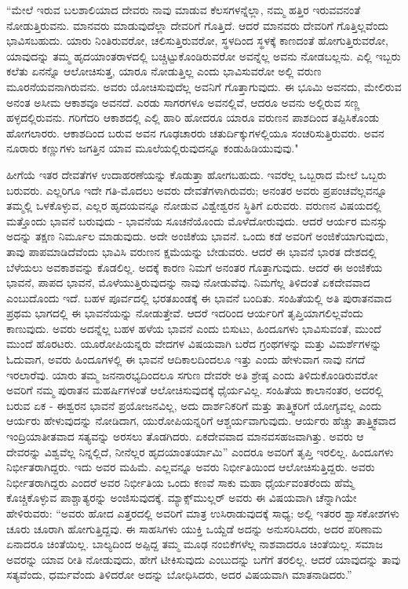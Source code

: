 “ಮೇಲೆ ಇರುವ ಬಲಶಾಲಿಯಾದ ದೇವರು ನಾವು ಮಾಡುವ ಕೆಲಸಗಳನ್ನೆಲ್ಲಾ, ನಮ್ಮ ಹತ್ತಿರ ಇರುವವನಂತೆ ನೋಡುತ್ತಿರುವನು. ಮಾನವರು ಮಾಡುವುದೆಲ್ಲಾ ದೇವರಿಗೆ ಗೊತ್ತಿದೆ. ಆದರೆ ಮಾನವರು ದೇವರಿಗೆ ಗೊತ್ತಿಲ್ಲವೆಂದು ಭಾವಿಸಬಹುದು. ಯಾರು ನಿಂತಿರುವರೋ, ಚಲಿಸುತ್ತಿರುವರೋ, ಸ್ಥಳದಿಂದ ಸ್ಥಳಕ್ಕೆ ಕಾಣದಂತೆ ಹೋಗುತ್ತಿರುವರೋ, ಯಾವುದನ್ನು ತಮ್ಮ ಹೃದಯಾಂತರಾಳದಲ್ಲಿ ಬಚ್ಚಿಟ್ಟುಕೊಂಡಿರುವರೋ ಅವನ್ನೆಲ್ಲ ಅವನು ನೋಡಬಲ್ಲನು. ಎಲ್ಲಿ ಇಬ್ಬರು ಕಲೆತು ಏನನ್ನೊ ಆಲೋಚಿಸುತ್ತ, ಯಾರೂ ನೋಡುತ್ತಿಲ್ಲ ಎಂದು ಭಾವಿಸುವರೋ ಅಲ್ಲಿ ವರುಣ ಮೂರನೆಯವನಾಗಿರುವನು. ಅವರು ಯೋಚಿಸುವುದೆಲ್ಲ ಅವನಿಗೆ ಗೊತ್ತಾಗುವುದು. ಈ ಭೂಮಿ ಅವನದು, ಮೇಲಿರುವ ಅನಂತ ಅಸೀಮ ಆಕಾಶವೂ ಅವನದೆ. ಎರಡು ಸಾಗರಗಳೂ ಅವನಲ್ಲಿವೆ, ಆದರೂ ಅವನು ಅಲ್ಲಿರುವ ಸಣ್ಣ ಹಳ್ಳದಲ್ಲಿರುವನು. ಗರಿಗೆದರಿ ಆಕಾಶದಲ್ಲಿ ಎಲ್ಲಿ ಹಾರಿ ಹೋದರೂ ಯಾರೂ ವರುಣನ ಪಾಶದಿಂದ ತಪ್ಪಿಸಿಕೊಂಡು ಹೋಗಲಾರರು. ಆಕಾಶದಿಂದ ಬರುವ ಅವನ ಗೂಢಚಾರರು ಚತುರ್ದಿಕ್ಕುಗಳಲ್ಲಿಯೂ ಸಂಚರಿಸುತ್ತಿರುವರು. ಅವನ ನೂರಾರು ಕಣ್ಣುಗಳು ಜಗತ್ತಿನ ಯಾವ ಮೂಲೆಯಲ್ಲಿರುವುದನ್ನೂ ಕಂಡುಹಿಡಿಯುವುವು."

ಹೀಗೆಯೆ ಇತರ ದೇವತೆಗಳ ಉದಾಹರಣೆಯನ್ನು ಕೊಡುತ್ತಾ ಹೋಗಬಹುದು. ಇವರೆಲ್ಲ ಒಬ್ಬರಾದ ಮೇಲೆ ಒಬ್ಬರು ಬರುವರು. ಎಲ್ಲರಿಗೂ ಇದೇ ಗತಿ-ಮೊದಲು ಅವರು ದೇವತೆಗಳಾಗಿರುವರು; ಅನಂತರ ಅವರು ಪ್ರಪಂಚವೆಲ್ಲವನ್ನೂ ತಮ್ಮಲ್ಲಿ ಒಳಕೊಳ್ಳುವ, ಎಲ್ಲರ ಹೃದಯವನ್ನೂ ನೋಡುವ ವಿಶ್ವೇಶ್ವರನ ಸ್ಥಿತಿಗೆ ಏರುವರು. ವರುಣನ ವಿಷಯದಲ್ಲಿ ಮತ್ತೊಂದು ಭಾವನೆ ಬರುವುದು - ಭಾವನೆಯ ಸೂಚನೆಯೊಂದು ಮೊಳೆದೋರುವುದು. ಆದರೆ ಆರ್ಯರ ಮನಸ್ಸು ಅದನ್ನು ತಕ್ಷಣ ನಿರ್ಮೂಲ ಮಾಡುವುದು. ಅದೇ ಅಂಜಿಕೆಯ ಭಾವನೆ. ಒಂದು ಕಡೆ ಅವರಿಗೆ ಅಂಜಿಕೆಯಾಗುವುದು, ತಾವು ಪಾಪಮಾಡಿದೆವೆಂದು ಭಾವಿಸಿ ವರುಣನ ಕ್ಷಮೆಯನ್ನು ಬೇಡುವರು. ಆದರೆ ಈ ಭಾವನೆ ಭಾರತ ದೇಶದಲ್ಲಿ ಬೆಳೆಯಲು ಅವಕಾಶವನ್ನು ಕೊಡಲಿಲ್ಲ. ಅದಕ್ಕೆ ಕಾರಣ ನಿಮಗೆ ಅನಂತರ ಗೊತ್ತಾಗುವುದು. ಆದರೆ ಈ ಅಂಜಿಕೆಯ ಭಾವನೆ, ಪಾಪದ ಭಾವನೆ, ಮೊಳೆಯುತ್ತಿರುವುದನ್ನು ನಾವು ನೋಡುವೆವು. ನಿಮಗೆಲ್ಲ ತಿಳಿದಂತೆ ಏಕದೇವವಾದ ಎಂಬುದೊಂದು ಇದೆ. ಬಹಳ ಪೂರ್ವದಲ್ಲಿ ಭರತಖಂಡಕ್ಕೆ ಈ ಭಾವನೆ ಬಂದಿತು. ಸಂಹಿತೆಯಲ್ಲಿ ಅತಿ ಪುರಾತನವಾದ ಪ್ರಥಮ ಭಾಗದಲ್ಲಿ ಈ ಭಾವನೆಯನ್ನು ನೋಡುತ್ತೇವೆ. ಆದರೆ ಇದರಿಂದ ಆರ್ಯರಿಗೆ ತೃಪ್ತಿಯಾಗಲಿಲ್ಲವೆಂದು ಕಾಣುವುದು. ಅವರು ಅದನ್ನೆಲ್ಲ ಬಹಳ ಹಳೆಯ ಭಾವನೆ ಎಂದು ಬಿಸುಟು, ಹಿಂದೂಗಳು ಭಾವಿಸುವಂತೆ, ಮುಂದೆ ಮುಂದೆ ಹೊರಟರು. ಯೂರೋಪಿಯನ್ನರು ವೇದಗಳ ವಿಷಯವಾಗಿ ಬರೆದ ಗ್ರಂಥಗಳನ್ನು ಮತ್ತು ವಿಮರ್ಶೆಗಳನ್ನು ಓದುವಾಗ, ಅವರು ಹಿಂದೂಗಳಲ್ಲಿ ಈ ಭಾವನೆ ಆದಿಕಾಲದಿಂದಲೂ ಇತ್ತು ಎಂದು ಹೇಳುವಾಗ ನಾವು ನಗದೆ ಇರಲಾರೆವು. ಯಾರು ತಮ್ಮ ಜನನಾರಭ್ಯದಿಂದಲೂ ಸಗುಣ ದೇವರೇ ಅತಿ ಶ್ರೇಷ್ಠ ಎಂದು ತಿಳಿದುಕೊಂಡಿರುವರೋ ಅವರಿಗೆ ನಮ್ಮ ಪುರಾತನ ಮಹರ್ಷಿಗಳಂತೆ ಆಲೋಚಿಸುವುದಕ್ಕೆ ಧೈರ್ಯವಿಲ್ಲ. ಸಂಹಿತೆಯ ಕಾಲಾನಂತರ, ಅದರಲ್ಲಿ ಬರುವ ಏಕ - ಈಶ್ವರನ ಭಾವನೆ ಪ್ರಯೋಜನವಿಲ್ಲ, ಅದು ದಾರ್ಶನಿಕರಿಗೆ ಮತ್ತು ತಾತ್ತ್ವಿಕರಿಗೆ ಯೋಗ್ಯವಲ್ಲ ಎಂದು ಆರ್ಯರು ಹೇಳುವುದನ್ನು ನೋಡಿದಾಗ, ಯುರೋಪಿಯನ್ನರಿಗೆ ಆಶ್ಚರ್ಯವಾಗುವುದು. ಆರ್ಯರು ಹೆಚ್ಚು ತಾತ್ತ್ವಿಕವಾದ ಇಂದ್ರಿಯಾತೀತವಾದ ಸತ್ಯವನ್ನು ಅರಸಲು ತೊಡಗಿದರು. ಏಕದೇವವಾದ ಮಾನವಸಹಜವಾಗಿತ್ತು. ಅವರು ಆ ದೇವರನ್ನು ವಿಶ್ವವೆಲ್ಲ ನಿನ್ನಲ್ಲಿದೆ, ನೀನೆಲ್ಲರ ಹೃದಯಾಂತರ್ಯಾಮಿ” ಎಂದರೂ ಅವರಿಗೆ ತೃಪ್ತಿ ಇರಲಿಲ್ಲ. ಹಿಂದೂಗಳು ನಿರ್ಭೀತರಾಗಿದ್ದರು. ಇದು ಅವರ ಮಹಿಮೆ. ಎಲ್ಲವನ್ನೂ ಅವರು ನಿರ್ಭೀತಿಯಿಂದ ಆಲೋಚಿಸುತ್ತಿದ್ದರು. ಅವರು ನಿರ್ಭೀತರಾಗಿದ್ದರು ಎಂದರೆ ಅವರ ನಿರ್ಭೀತಿಯ ಒಂದು ಕಣವೆ ಸಾಕು ಮಹಾ ಧೈರ್ಯವಂತರೆಂದು ಹೆಮ್ಮೆ ಕೊಚ್ಚಿಕೊಳ್ಳುವ ಪಾಶ್ಚಾತ್ಯರನ್ನು ಅಂಜಿಸುವುದಕ್ಕೆ. ಮ್ಯಾಕ್ಸ್‌ಮುಲ್ಲರ್ ಅವರು ಈ ವಿಷಯವಾಗಿ ಚೆನ್ನಾಗಿಯೇ ಹೇಳಿರುವರು: “ಅವರು ಹೋದ ಎತ್ತರದಲ್ಲಿ ಅವರಿಗೆ ಮಾತ್ರ ಉಸಿರಾಡುವುದಕ್ಕೆ ಸಾಧ್ಯ; ಅಲ್ಲಿ ಇತರರ ಶ್ವಾಸಕೋಶಗಳು ಚೂರು ಚೂರಾಗಿ ಹೋಗುತ್ತಿದ್ದವು. ಈ ಸಾಹಸಿಗಳು ಯುಕ್ತಿ ಒಯ್ದೆಡೆ ಅದನ್ನು ಅನುಸರಿಸಿದರು, ಅದರ ಪರಿಣಾಮ ಏನಾದರೂ ಚಿಂತೆಯಿಲ್ಲ. ಬಾಲ್ಯದಿಂದ ಅಪ್ಪಿದ್ದ ತಮ್ಮ ಮೂಢ ನಂಬಿಕೆಗಳೆಲ್ಲ ನಾಶವಾದರೂ ಚಿಂತೆಯಿಲ್ಲ. ಸಮಾಜ ಅವರನ್ನು ಯಾವ ರೀತಿ ನೋಡುವುದು, ಹೇಗೆ ಟೀಕಿಸುವುದು ಎಂಬುದನ್ನು ಬಗೆಗೆ ತರಲಿಲ್ಲ. ಆದರೆ ಯಾವುದನ್ನು ತಾವು ಸತ್ಯವೆಂದು, ಧರ್ಮವೆಂದು ತಿಳಿದರೋ ಅದನ್ನು ಬೋಧಿಸಿದರು, ಅದರ ವಿಷಯವಾಗಿ ಮಾತನಾಡಿದರು.”

